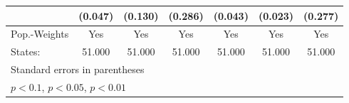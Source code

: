 {\begin{tabular}{l*{6}{c}}
            &     (0.047)         &     (0.130)         &     (0.286)         &     (0.043)         &     (0.023)         &     (0.277)         \\
\hline
Pop.-Weights&         Yes         &         Yes         &         Yes         &         Yes         &         Yes         &         Yes         \\
States:     &      51.000         &      51.000         &      51.000         &      51.000         &      51.000         &      51.000         \\
\hline\hline
\multicolumn{7}{l}{\footnotesize Standard errors in parentheses}\\
\multicolumn{7}{l}{\footnotesize \sym{*} \(p<0.1\), \sym{**} \(p<0.05\), \sym{***} \(p<0.01\)}\\
\end{tabular}
}
